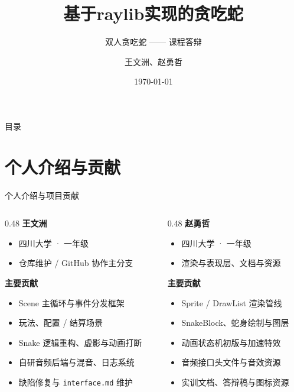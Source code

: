 \documentclass[aspectratio=169,13pt]{beamer}
\title[Snake Terminal]{基于raylib实现的贪吃蛇}
\subtitle{双人贪吃蛇 —— 课程答辩}
\author{王文洲、赵勇哲}
\institute[四川大学]{Sichuan University}
\date{\today}
\begin{document}
\begin{frame}
  \titlepage
\end{frame}

\begin{frame}{目录}
  \tableofcontents
\end{frame}

\section{个人介绍与贡献}

\begin{frame}{个人介绍与项目贡献}
  \begin{columns}[T]
    \begin{column}{0.48\textwidth}
      \textbf{王文洲}
      \begin{itemize}
        \item 四川大学 · 一年级
        \item 仓库维护 / GitHub 协作主分支
      \end{itemize}
      \vspace{0.3em}
      {\small\textbf{主要贡献}}
      \begin{itemize}
        \item Scene 主循环与事件分发框架
        \item 玩法、配置 / 结算场景
        \item Snake 逻辑重构、虚影与动画打断
        \item 自研音频后端与混音、日志系统
        \item 缺陷修复与 \texttt{interface.md} 维护
      \end{itemize}
    \end{column}
    \begin{column}{0.48\textwidth}
      \textbf{赵勇哲}
      \begin{itemize}
        \item 四川大学 · 一年级
        \item 渲染与表现层、文档与资源
      \end{itemize}
      \vspace{0.3em}
      {\small\textbf{主要贡献}}
      \begin{itemize}
        \item Sprite / DrawList 渲染管线
        \item SnakeBlock、蛇身绘制与图层
        \item 动画状态机初版与加速特效
        \item 音频接口头文件与音效资源
        \item 实训文档、答辩稿与图标资源
      \end{itemize}
    \end{column}
  \end{columns}
\end{frame}
\end{document}
